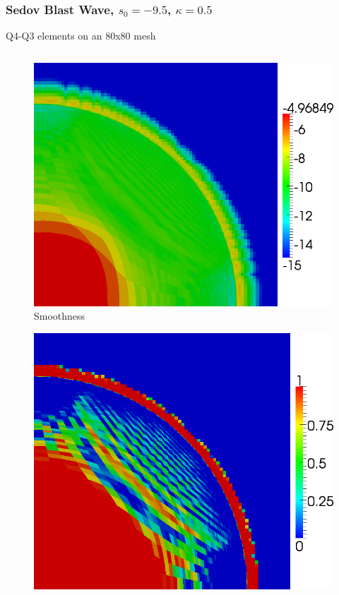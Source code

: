 \documentclass[8pt,xcolor=svgnames]{beamer}
\begin{document}
\begin{frame}\frametitle{Sedov Blast Wave, $s_0=-9.5$, $\kappa=0.5$}
\vspace{1ex}
Q4-Q3 elements on an 80x80 mesh
\vspace{-4ex}
\begin{columns}
\begin{column}{0.3\textwidth}
\begin{figure}[t]
\begin{center}
\includegraphics[height=0.9\textwidth]{figs/Sedov/Q2l-80-smoothness.png}
\\Smoothness
\end{center}
\end{figure}
\begin{figure}[t]
\begin{center}
\includegraphics[height=0.9\textwidth]{figs/Sedov/Q2l-80-limiter.png}

\end{center}
\end{figure}
\end{column}
\end{columns}
\end{frame}
\end{document}
